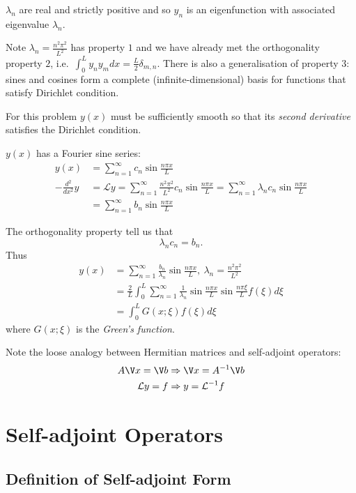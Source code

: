 \documentclass[a4paper]{article}
\renewcommand*\L{\mathcal{L}}
\begin{document}
\begin{note}
  \(\lambda_n\) are real and strictly positive and so \(y_n\) is an eigenfunction with associated eigenvalue \(\lambda_n\).
\end{note}

Note \(\lambda_n = \frac{n^2\pi^2}{L^2}\) has property \(1\) and we have already met the orthogonality property \(2\), i.e.\ \(\int_{0}^{L} y_ny_m dx=\frac{L}{2}\delta_{m,n} \). There is also a generalisation of property \(3\): sines and cosines form a complete (infinite-dimensional) basis for functions that satisfy Dirichlet condition.

For this problem \(y(x)\) must be sufficiently smooth so that its \emph{second derivative} satisfies the Dirichlet condition.

\(y(x)\) has a Fourier sine series:
\begin{align*}
  y(x) &= \sum_{n=1}^{\infty}c_n \sin \frac{n\pi x}{L} \\
  -\frac{d^2}{dx^2} y &= \L y = \sum_{n=1}^{\infty} \frac{n^2\pi^2}{L^2}c_n \sin \frac{n\pi x}{L} = \sum_{n=1}^{\infty} \lambda_n c_n \sin \frac{n\pi x}{L} \\
       &= \sum_{n=1}^{\infty}b_n \sin \frac{n\pi x}{L}
\end{align*}

The orthogonality property tell us that
\[
\lambda_n c_n = b_n.
\]
Thus
\begin{align*}
  y(x) &= \sum_{n=1}^{\infty} \frac{b_n}{\lambda_n} \sin \frac{n\pi x}{L}, \: \lambda_n = \frac{n^2\pi^2}{L^2} \\
       &= \frac{2}{L} \int_{0}^{L} \sum_{n=1}^{\infty} \frac{1}{\lambda_n} \sin \frac{n\pi x}{L}\sin\frac{n\pi\xi}{L} f(\xi) d\xi \\
        &= \int_{0}^{L} G(x; \xi) f(\xi) d\xi\end{align*}
where \(G(x;\xi)\) is the \emph{Green's function}.

Note the loose analogy between Hermitian matrices and self-adjoint operators:
\begin{align*}
  A\V x = \V b &\Rightarrow \V x = A^{-1}\V b \\
  \L y = f &\Rightarrow y = \L^{-1} f
\end{align*}

\section{Self-adjoint Operators}

\subsection{Definition of Self-adjoint Form}
\end{document}
